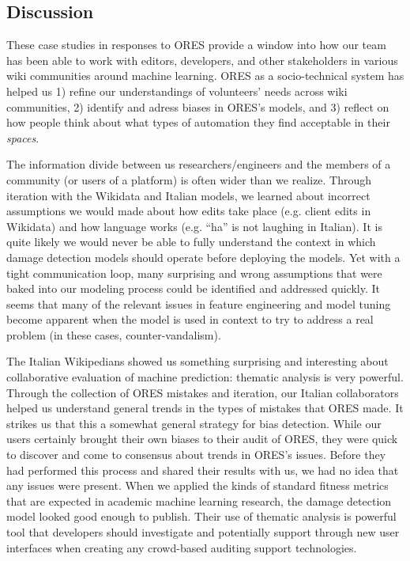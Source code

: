 \subsection{Discussion}
These case studies in responses to ORES provide a window into how our team has been able to work with editors, developers, and other stakeholders in various wiki communities around machine learning. ORES as a socio-technical system has helped us 1) refine our understandings of volunteers' needs across wiki communities, 2) identify and adress biases in ORES's models, and 3) reflect on how people think about what types of automation they find acceptable in their \emph{spaces}.

The information divide between us researchers/engineers and the members of a community (or users of a platform) is often wider than we realize.  Through iteration with the Wikidata and Italian models, we learned about incorrect assumptions we would made about how edits take place (e.g. client edits in Wikidata) and how language works (e.g. ``ha'' is not laughing in Italian).  It is quite likely we would never be able to fully understand the context in which damage detection models should operate before deploying the models.  Yet with a tight communication loop, many surprising and wrong assumptions that were baked into our modeling process could be identified and addressed quickly.  It seems that many of the relevant issues in feature engineering and model tuning become apparent when the model is used in context to try to address a real problem (in these cases, counter-vandalism).

The Italian Wikipedians showed us something surprising and interesting about collaborative evaluation of machine prediction: thematic analysis is very powerful.  Through the collection of ORES mistakes and iteration, our Italian collaborators helped us understand general trends in the types of mistakes that ORES made.  It strikes us that this a somewhat general strategy for bias detection.  While our users certainly brought their own biases to their audit of ORES, they were quick to discover and come to consensus about trends in ORES's issues.  Before they had performed this process and shared their results with us, we had no idea that any issues were present. When we applied the kinds of standard fitness metrics that are expected in academic machine learning research, the damage detection model looked good enough to publish.  Their use of thematic analysis is powerful tool that developers should investigate and potentially support through new user interfaces when creating any crowd-based auditing support technologies.

